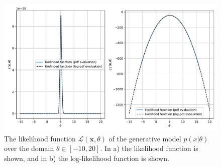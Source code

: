 \documentclass{article}
\begin{document}
\begin{figure}[htb!]
\centering
\includegraphics[scale=0.6]{Q1a_3.pdf}
\caption{The likelihood function $\mathcal{L}(\mathbf{x}, \theta)$ of the generative model $p(x \vert \theta)$ over the domain $\theta \in [-10, 20]$. In a) the likelihood function is shown, and in b) the log-likelihood function is shown.}
\label{fig:Q1a_likelihood}
\end{figure}
\end{document}
